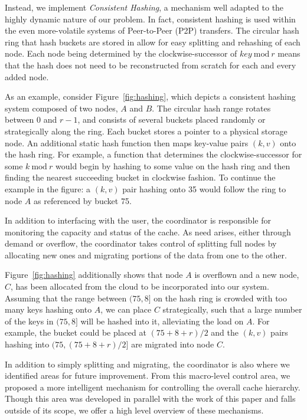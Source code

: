 Instead, we implement \emph{Consistent Hashing}\cite{karger1}, a mechanism well
adapted to the highly dynamic nature of our problem. In fact, consistent
hashing is used within the even more-volatile systems of Peer-to-Peer (P2P)
transfers. The circular hash ring that hash buckets are stored in allow for
easy splitting and rehashing of each node. Each node being determined by the
clockwise-successor of $key\ \textrm{mod}\ r$ means that the hash does not need to be
reconstructed from scratch for each and every added node.

As an example, consider Figure~\ref{fig:hashing}, which depicts a consistent
hashing system composed of two nodes, $A$ and $B$. The circular hash range
rotates between $0$ and $r-1$, and consists of several buckets placed randomly
or strategically along the ring. Each bucket stores a pointer to a physical
storage node. An additional static hash function then maps key-value pairs
$(k,v)$ onto the hash ring. For example, a function that determines the
clockwise-successor for some $k\ \textrm{mod}\ r$ would begin by hashing to some
value on the hash ring and then finding the nearest succeeding bucket in
clockwise fashion. To continue the example in the figure: a $(k,v)$ pair
hashing onto 35 would follow the ring to node $A$ as referenced by bucket 75.

In addition to interfacing with the user, the coordinator is responsible for
monitoring the capacity and status of the cache. As need arises, either through
demand or overflow, the coordinator takes control of splitting full nodes by
allocating new ones and migrating portions of the data from one to the other.

Figure~\ref{fig:hashing} additionally shows that node $A$ is overflown and a
new node, $C$, has been allocated from the cloud to be incorporated into our
system. Assuming that the range between $(75,8]$ on the hash ring is crowded
with too many keys hashing onto $A$, we can place $C$ strategically, such that
a large number of the keys in $(75,8]$ will be hashed into it, alleviating the
load on $A$. For example, the bucket could be placed at $(75 + 8 + r)/2$ and
the $(k,v)$ pairs hashing into $(75, (75 + 8 + r)/2]$ are migrated into node $C$.

In addition to simply splitting and migrating, the coordinator is also where we
identified areas for future improvement\cite{chiu_ijngc11}. From this
macro-level control area, we proposed a more intelligent mechanism for
controlling the overall cache hierarchy. Though this area was developed in
parallel with the work of this paper and falls outside of its scope, we offer a
high level overview of these mechanisms.

